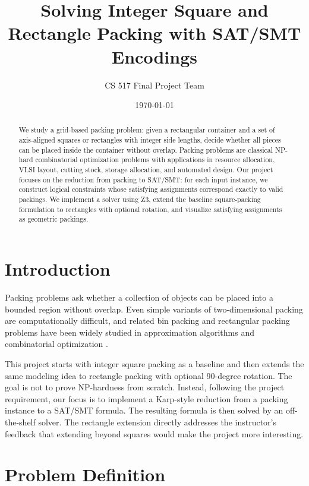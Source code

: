 \documentclass[11pt]{article}
\title{Solving Integer Square and Rectangle Packing with SAT/SMT Encodings}
\author{CS 517 Final Project Team}
\date{\today}
\begin{document}
\maketitle

\begin{abstract}
We study a grid-based packing problem: given a rectangular container and a
set of axis-aligned squares or rectangles with integer side lengths, decide
whether all pieces can be placed inside the container without overlap. Packing problems
are classical NP-hard combinatorial optimization problems with applications in
resource allocation, VLSI layout, cutting stock, storage allocation, and
automated design. Our project focuses on the reduction from packing to
SAT/SMT: for each input instance, we construct logical constraints whose
satisfying assignments correspond exactly to valid packings. We implement a
solver using Z3, extend the baseline square-packing formulation to rectangles
with optional rotation, and visualize satisfying assignments as geometric
packings.
\end{abstract}

\section{Introduction}

Packing problems ask whether a collection of objects can be placed into a
bounded region without overlap. Even simple variants of two-dimensional
packing are computationally difficult, and related bin packing and rectangular
packing problems have been widely studied in approximation algorithms and
combinatorial optimization \cite{garey1979computers,coffman1980performance}.

This project starts with integer square packing as a baseline and then extends
the same modeling idea to rectangle packing with optional 90-degree rotation.
The goal is not to prove NP-hardness from scratch. Instead, following the
project requirement, our focus is to implement a Karp-style reduction from a
packing instance to a SAT/SMT formula. The resulting formula is then solved by
an off-the-shelf solver. The rectangle extension directly addresses the
instructor's feedback that extending beyond squares would make the project more
interesting.

\section{Problem Definition}
\end{document}
